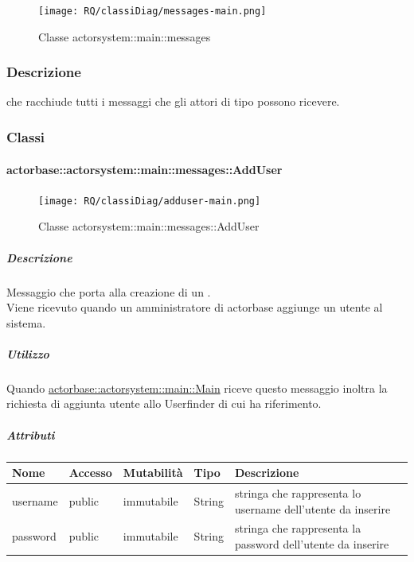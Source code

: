 \documentclass{scalatekids-article}
\begin{document}
\begin{figure}[H]
  \begin{center}
    \texttt{[image: RQ/classiDiag/messages-main.png]}
    \caption{Classe actorsystem::main::messages}
  \end{center}
\end{figure}

\subsubsection{Descrizione}
 che racchiude tutti i messaggi che gli attori di tipo
 possono ricevere.

\subsubsection{Classi}

\paragraph{actorbase::actorsystem::main::messages::AddUser}
\label{sec:actorbase::actorsystem::main::messages::AddUser}

\begin{figure}[H]
  \begin{center}
    \texttt{[image: RQ/classiDiag/adduser-main.png]}
    \caption{Classe actorsystem::main::messages::AddUser}
  \end{center}
\end{figure}

\subparagraph{Descrizione}
Messaggio che porta alla creazione di un .\\Viene ricevuto
quando un amministratore di actorbase aggiunge un utente al sistema.

\subparagraph{Utilizzo}
Quando \hyperref[sec:actorbase::actorsystem::main::Main]{actorbase::actorsystem::main::Main}
riceve questo messaggio inoltra la richiesta di aggiunta utente allo
Userfinder di cui ha riferimento.

\subparagraph{Attributi}
\begin{tabular}{| p{3cm} | p{1.5cm} | p{2cm} | p{2cm} | p{8.5cm} |}
  \hline
  Nome & Accesso & Mutabilità & Tipo & Descrizione\\
  \hline
  username & public & immutabile & String & stringa che rappresenta lo username dell'utente da inserire \\
  \hline
  password & public & immutabile & String & stringa che rappresenta la password dell'utente da inserire \\
  \hline
\end{tabular}
\end{document}

